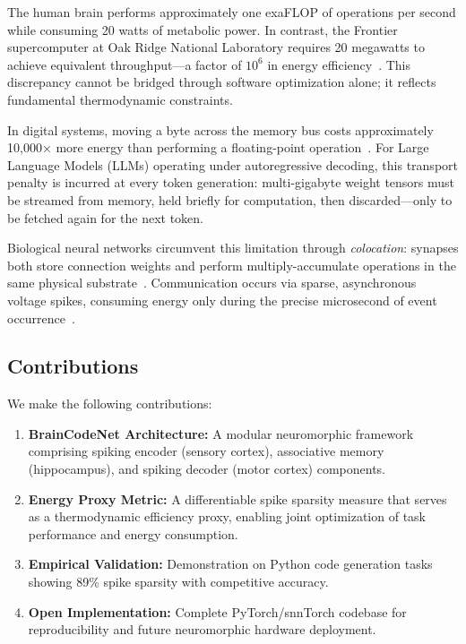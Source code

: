 \documentclass[11pt,a4paper]{article}
\begin{document}
The human brain performs approximately one exaFLOP of operations per second while consuming 20 watts of metabolic power. In contrast, the Frontier supercomputer at Oak Ridge National Laboratory requires 20 megawatts to achieve equivalent throughput—a factor of $10^6$ in energy efficiency~\citep{top500}. This discrepancy cannot be bridged through software optimization alone; it reflects fundamental thermodynamic constraints.

In digital systems, moving a byte across the memory bus costs approximately 10,000× more energy than performing a floating-point operation~\citep{horowitz2014computing}. For Large Language Models (LLMs) operating under autoregressive decoding, this transport penalty is incurred at every token generation: multi-gigabyte weight tensors must be streamed from memory, held briefly for computation, then discarded—only to be fetched again for the next token.

Biological neural networks circumvent this limitation through \emph{colocation}: synapses both store connection weights and perform multiply-accumulate operations in the same physical substrate~\citep{indiveri2015memory}. Communication occurs via sparse, asynchronous voltage spikes, consuming energy only during the precise microsecond of event occurrence~\citep{mead1990neuromorphic}.

\subsection{Contributions}

We make the following contributions:

\begin{enumerate}
    \item \textbf{BrainCodeNet Architecture:} A modular neuromorphic framework comprising spiking encoder (sensory cortex), associative memory (hippocampus), and spiking decoder (motor cortex) components.
    
    \item \textbf{Energy Proxy Metric:} A differentiable spike sparsity measure that serves as a thermodynamic efficiency proxy, enabling joint optimization of task performance and energy consumption.
    
    \item \textbf{Empirical Validation:} Demonstration on Python code generation tasks showing 89\% spike sparsity with competitive accuracy.
    
    \item \textbf{Open Implementation:} Complete PyTorch/snnTorch codebase for reproducibility and future neuromorphic hardware deployment.
\end{enumerate}
\end{document}

